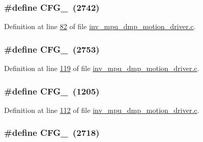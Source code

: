 \subsubsection[{\texorpdfstring{C\+F\+G\+\_\+27}{CFG_27}}]{\setlength{\rightskip}{0pt plus 5cm}\#define C\+F\+G\+\_~(2742)}\hypertarget{group___d_r_i_v_e_r_s_gaae53afa64170cb4723c04f16c2fa5f30}{}\label{group___d_r_i_v_e_r_s_gaae53afa64170cb4723c04f16c2fa5f30}


Definition at line \hyperlink{inv__mpu__dmp__motion__driver_8c_source_l00082}{82} of file \hyperlink{inv__mpu__dmp__motion__driver_8c_source}{inv\+\_\+mpu\+\_\+dmp\+\_\+motion\+\_\+driver.\+c}.

\subsubsection[{\texorpdfstring{C\+F\+G\+\_\+6}{CFG_6}}]{\setlength{\rightskip}{0pt plus 5cm}\#define C\+F\+G\+\_~(2753)}\hypertarget{group___d_r_i_v_e_r_s_ga40938f669c5b33b4316a7a5fba679eba}{}\label{group___d_r_i_v_e_r_s_ga40938f669c5b33b4316a7a5fba679eba}


Definition at line \hyperlink{inv__mpu__dmp__motion__driver_8c_source_l00119}{119} of file \hyperlink{inv__mpu__dmp__motion__driver_8c_source}{inv\+\_\+mpu\+\_\+dmp\+\_\+motion\+\_\+driver.\+c}.

\subsubsection[{\texorpdfstring{C\+F\+G\+\_\+7}{CFG_7}}]{\setlength{\rightskip}{0pt plus 5cm}\#define C\+F\+G\+\_~(1205)}\hypertarget{group___d_r_i_v_e_r_s_gaf07742dc92c885f8f7d59e70683f9257}{}\label{group___d_r_i_v_e_r_s_gaf07742dc92c885f8f7d59e70683f9257}


Definition at line \hyperlink{inv__mpu__dmp__motion__driver_8c_source_l00112}{112} of file \hyperlink{inv__mpu__dmp__motion__driver_8c_source}{inv\+\_\+mpu\+\_\+dmp\+\_\+motion\+\_\+driver.\+c}.

\subsubsection[{\texorpdfstring{C\+F\+G\+\_\+8}{CFG_8}}]{\setlength{\rightskip}{0pt plus 5cm}\#define C\+F\+G\+\_~(2718)}\hypertarget{group___d_r_i_v_e_r_s_ga3dc0e5c81e361fb871fbf63eeba82520}{}\label{group___d_r_i_v_e_r_s_ga3dc0e5c81e361fb871fbf63eeba82520}


